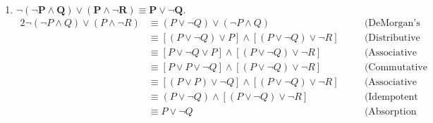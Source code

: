 \begin{enumerate}[label=(\alph*)]
    \item \textbf{$\bm{\neg (\neg P \wedge Q) \vee (P \wedge \neg R) \equiv P \vee \neg Q.}$}
        \begin{alignat*}{2}
            \neg (\neg P \wedge Q) \vee (P \wedge \neg R) & \equiv (P \vee \neg Q) \vee (\neg P \wedge Q) && \quad \text{(DeMorgan's Law)}\\
            & \equiv [(P \vee \neg Q) \vee P] \wedge [(P \vee \neg Q) \vee \neg R] && \quad \text{(Distributive Law)} \\
            & \equiv [P \vee \neg Q \vee P] \wedge [(P \vee \neg Q) \vee \neg R] && \quad \text{(Associative Law)} \\
            & \equiv [P \vee P \vee \neg Q] \wedge [(P \vee \neg Q) \vee \neg R] && \quad \text{(Commutative Law)} \\
            & \equiv [(P \vee P) \vee \neg Q] \wedge [(P \vee \neg Q) \vee \neg R] && \quad \text{(Associative Law)} \\
            & \equiv (P \vee \neg Q) \wedge [(P \vee \neg Q) \vee \neg R] && \quad \text{(Idempotent Law)} \\
            & \equiv P \vee \neg Q && \quad \text{(Absorption Law)} \\
        \end{alignat*}

\pagebreak


\end{enumerate}
